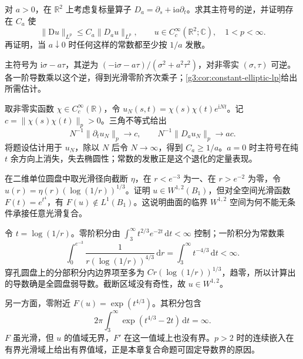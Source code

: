 \begin{exercise}\label{g3:ex:cr-degenerating-symbol}
	对 \(a>0\)，在 \(\mathbb R^2\) 上考虑复标量算子 \(D_a=\partial_s+\mathrm i a\partial_t\)。求其主符号的逆，并证明存在 \(C_a\) 使
	\[
		\|\mathrm Du\|_{L^p}\le C_a\|D_au\|_{L^p},\qquad u\in C_c^\infty(\mathbb R^2;\mathbb C),\quad1<p<\infty.
	\]
	再证明，当 \(a\downarrow0\) 时任何这样的常数都至少按 \(1/a\) 发散。
\end{exercise}
\begin{solution}
	主符号为 \(\mathrm i\sigma-a\tau\)，其逆为 \((-\mathrm i\sigma-a\tau)/(\sigma^2+a^2\tau^2)\)，对非零实 \((\sigma,\tau)\) 可逆。各一阶导数乘以这个逆，得到光滑零阶齐次乘子；\cref{g3:cor:constant-elliptic-lp}给出所需估计。

	取非零实函数 \(\chi\in C_c^\infty(\mathbb R)\)，令 \(u_N(s,t)=\chi(s)\chi(t)e^{\mathrm iNt}\)。记 \(c=\|\chi(s)\chi(t)\|_p>0\)。三角不等式给出
	\[
		N^{-1}\|\partial_tu_N\|_p\longrightarrow c,
		\qquad N^{-1}\|D_au_N\|_p\longrightarrow ac.
	\]
	将题设估计用于 \(u_N\)，除以 \(N\) 后令 \(N\to\infty\)，得到 \(C_a\ge1/a\)。\(a=0\) 时主符号在纯 \(t\) 余方向上消失，失去椭圆性；常数的发散正是这个退化的定量表现。
\end{solution}

\begin{exercise}\label{g3:ex:critical-surface-composition}
	在二维单位圆盘中取光滑径向截断 \(\eta\)，在 \(r<e^{-3}\) 为一、在 \(r>e^{-2}\) 为零，令 \(u(r)=\eta(r)(\log(1/r))^{1/3}\)。证明 \(u\in W^{1,2}(B_1)\)，但对全空间光滑函数 \(F(t)=e^{t^4}\)，有 \(F(u)\notin L^1(B_1)\)。这说明曲面的临界 \(W^{1,2}\) 空间为何不能无条件承接任意光滑复合。
\end{exercise}
\begin{solution}
	令 \(t=\log(1/r)\)。零阶积分由 \(\int_3^\infty t^{2/3}e^{-2t}\,\mathrm dt<\infty\) 控制；一阶积分为常数乘
	\[
		\int_0^{e^{-3}}\frac{1}{r(\log(1/r))^{4/3}}\,\mathrm dr
		=\int_3^\infty t^{-4/3}\,\mathrm dt<\infty.
	\]
	穿孔圆盘上的分部积分内边界项至多为 \(Cr(\log(1/r))^{1/3}\)，趋零，所以计算出的导数确是全圆盘弱导数。截断区域没有奇性，故 \(u\in W^{1,2}\)。

	另一方面，零附近 \(F(u)=\exp(t^{4/3})\)。其积分包含
	\[
		2\pi\int_3^\infty\exp(t^{4/3}-2t)\,\mathrm dt=\infty.
	\]
	\(F\) 虽光滑，但 \(u\) 的值域无界，\(F'\) 在这一值域上也没有界。\(p>2\) 时的连续嵌入在有界光滑域上给出有界值域，正是本章复合命题可固定导数界的原因。
\end{solution}

